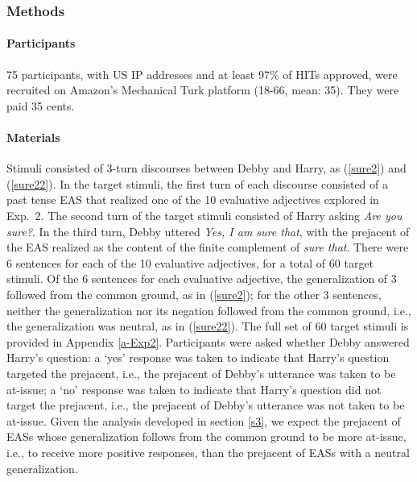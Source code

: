 \documentclass[11pt,fleqn]{article}
\newcommand{\6}{\mbox{$[\hspace*{-.6mm}[$}}
\newcommand{\9}{\mbox{$]\hspace*{-.6mm}]$}}
\begin{document}
\subsubsection{Methods}

\paragraph{Participants} 75 participants, with US IP addresses and at least 97\% of HITs approved, were recruited on Amazon's Mechanical Turk platform (18-66, mean: 35). They were paid 35 cents.

\paragraph{Materials} Stimuli consisted of 3-turn discourses between Debby and Harry, as (\ref{sure2}) and (\ref{sure22}). In the target stimuli, the first turn of each discourse consisted of a past tense EAS that realized one of the 10 evaluative adjectives explored in Exp.~2. The second turn of the target stimuli consisted of Harry asking {\em Are you sure?}. In the third turn, Debby uttered {\em Yes, I am sure that}, with the prejacent of the EAS realized as the content of the finite complement of {\em sure that}. There were 6 sentences for each of the 10 evaluative adjectives, for a total of 60 target stimuli. Of the 6 sentences for each evaluative adjective, the generalization of 3 followed from the common ground, as in (\ref{sure2}); for the other 3 sentences, neither the generalization nor its negation followed from the common ground, i.e., the generalization was neutral, as in (\ref{sure22}). The full set of 60 target stimuli is provided in Appendix \ref{a-Exp2}. Participants were asked whether Debby answered Harry's question: a `yes' response was taken to indicate that Harry's question targeted the prejacent, i.e., the prejacent of Debby's utterance was taken to be at-issue; a `no' response was taken to indicate that Harry's question did not target the prejacent, i.e., the prejacent of Debby's utterance was not taken to be at-issue. Given the analysis developed in section \ref{s3}, we expect the prejacent of EASs whose generalization follows from the common ground to be more at-issue, i.e., to receive more positive responses, than the prejacent of EASs with a neutral generalization.
\end{document}
